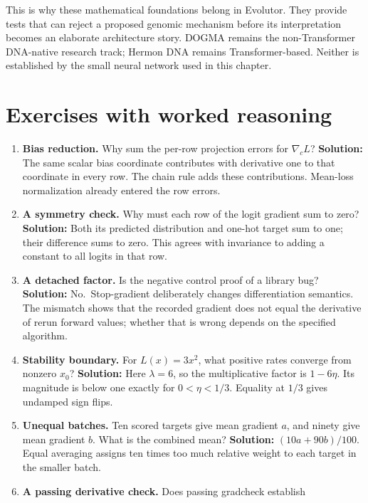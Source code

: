 This is why these mathematical foundations belong in Evolutor. They
provide tests that can reject a proposed genomic mechanism before its
interpretation becomes an elaborate architecture story. DOGMA remains
the non-Transformer DNA-native research track; Hermon DNA remains
Transformer-based. Neither is established by the small neural network
used in this chapter.

\section{Exercises with worked
reasoning}\label{exercises-with-worked-reasoning}

\begin{enumerate}
\def\labelenumi{\arabic{enumi}.}
\item
  \textbf{Bias reduction.} Why sum the per-row projection errors for
  \(\nabla_cL\)? \textbf{Solution:} The same scalar bias coordinate
  contributes with derivative one to that coordinate in every row. The
  chain rule adds these contributions. Mean-loss normalization already
  entered the row errors.
\item
  \textbf{A symmetry check.} Why must each row of the logit gradient sum
  to zero? \textbf{Solution:} Both its predicted distribution and
  one-hot target sum to one; their difference sums to zero. This agrees
  with invariance to adding a constant to all logits in that row.
\item
  \textbf{A detached factor.} Is the negative control proof of a library
  bug? \textbf{Solution:} No.~Stop-gradient deliberately changes
  differentiation semantics. The mismatch shows that the recorded
  gradient does not equal the derivative of rerun forward values;
  whether that is wrong depends on the specified algorithm.
\item
  \textbf{Stability boundary.} For \(L(x)=3x^2\), what positive rates
  converge from nonzero \(x_0\)? \textbf{Solution:} Here \(\lambda=6\),
  so the multiplicative factor is \(1-6\eta\). Its magnitude is below
  one exactly for \(0<\eta<1/3\). Equality at \(1/3\) gives undamped
  sign flips.
\item
  \textbf{Unequal batches.} Ten scored targets give mean gradient \(a\),
  and ninety give mean gradient \(b\). What is the combined mean?
  \textbf{Solution:} \((10a+90b)/100\). Equal averaging assigns ten
  times too much relative weight to each target in the smaller batch.
\item
  \textbf{A passing derivative check.} Does passing gradcheck establish

\end{enumerate}
